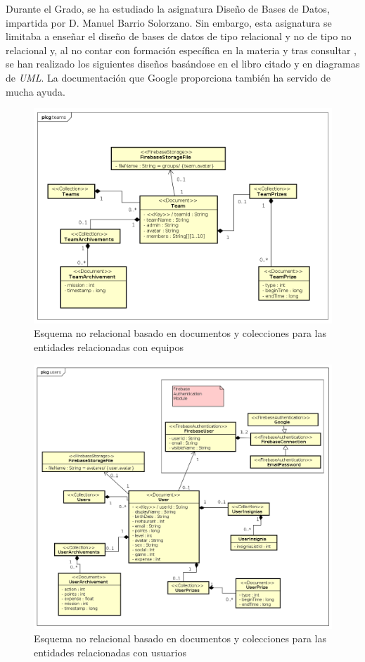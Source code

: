 \documentclass[twoside]{report}
\begin{document}
Durante el Grado, se ha estudiado la asignatura Diseño de Bases de Datos, impartida por D. Manuel Barrio Solorzano. Sin embargo, esta asignatura se limitaba a enseñar el diseño de bases de datos de tipo relacional y no de tipo no relacional y, al no contar con formación específica en la materia y tras consultar \cite{databasedesign}, se han realizado los siguientes diseños basándose en el libro citado y en diagramas de \textit{UML}. La documentación que Google proporciona \cite{fireference} también ha servido de mucha ayuda.

\begin{figure}[H]
\centering
\includegraphics[scale=0.5]{images/databaseNRteams}
\caption{Esquema no relacional basado en documentos y colecciones para las entidades relacionadas con equipos}
\label{nrteams}
\end{figure}

\begin{figure}[H]
\centering
\includegraphics[scale=0.5]{images/databaseNRusers}
\caption{Esquema no relacional basado en documentos y colecciones para las entidades relacionadas con usuarios}
\label{nrusers}
\end{figure}
\end{document}
